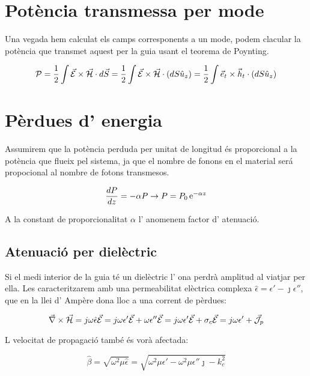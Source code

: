 \section{Potència transmessa per mode}

Una vegada hem calculat els camps corresponents a un mode, podem clacular la potència que transmet aquest per la guia usant el teorema de Poynting.

\begin{equation}
  \mathcal P = \frac{1}{2} \int \vec{\mathcal{E}} \times \vec{\mathcal{H}} \cdot d \vec S = \frac{1}{2} \int \vec{\mathcal{E}} \times \vec{\mathcal{H}} \cdot (dS \hat u_z) = \frac{1}{2} \int \vec e_t \times \vec h_t  \cdot (dS \hat u_z)
\end{equation}

\section{Pèrdues d' energia}

Assumirem que la potència perduda per unitat de longitud és proporcional a la potència que flueix pel sistema, ja que el nombre de fonons en el material será propocional al nombre de fotons transmesos.

\begin{equation}
  \frac{dP}{dz} = -\alpha P \to P = P_0 \operatorname{e}^{- \alpha z}
\end{equation}

A la constant de proporcionalitat $\alpha$ l' anomenem factor d' atenuació.

\subsection{Atenuació per dielèctric}

Si el medi interior de la guia té un dielèctric l' ona perdrà amplitud al viatjar per ella. Les caracteritzarem amb una permeabilitat elèctrica complexa $\hat \epsilon = \epsilon' - \jmath \epsilon '' $, que en la llei d' Ampère dona lloc a una corrent de pèrdues:

\begin{equation}
  \vec \nabla \times \vec{\mathcal{H}} = j \omega \hat \epsilon \vec{\mathcal{E}} = j \omega \epsilon ' \vec{\mathcal{E}} + \omega \epsilon '' \vec{\mathcal{E}} = j \omega \epsilon ' \vec{\mathcal{E}} + \sigma _c \vec{\mathcal{E}} = j \omega \epsilon ' + \vec{\mathcal{J}} _p
\end{equation}

L velocitat de propagació també és vorà afectada:

\begin{equation}
  \hat \beta = \sqrt{\omega ^2 \mu\hat \epsilon } = \sqrt{\omega^2 \mu\epsilon'-\omega^2 \mu\epsilon '' \jmath - k_c ^2}
\end{equation}


